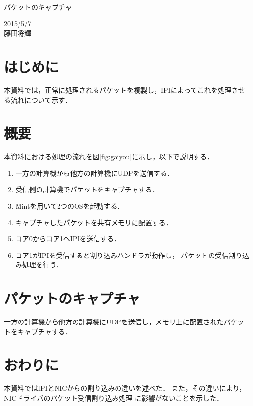 \documentclass[12pt]{jsarticle}
\begin{document}

\begin{center}
{\LARGE パケットのキャプチャ}
\end{center}

\begin{flushright}
  2015/5/7\\
  藤田将輝
\end{flushright}
\section{はじめに}
本資料では，正常に処理されるパケットを複製し，IPIによってこれを処理させる流れについて示す．
\section{概要}
本資料における処理の流れを図\ref{fig:gaiyou}に示し，以下で説明する．
\begin{enumerate}
    \item 一方の計算機から他方の計算機にUDPを送信する．
    \item 受信側の計算機でパケットをキャプチャする．
    \item Mintを用いて2つのOSを起動する．
    \item キャプチャしたパケットを共有メモリに配置する．
    \item コア0からコア1へIPIを送信する．
    \item コア1がIPIを受信すると割り込みハンドラが動作し，
        パケットの受信割り込み処理を行う．
\end{enumerate}
\section{パケットのキャプチャ}
一方の計算機から他方の計算機にUDPを送信し，メモリ上に配置されたパケットをキャプチャする．

\section{おわりに}
本資料ではIPIとNICからの割り込みの違いを述べた．
また，その違いにより，NICドライバのパケット受信割り込み処理
に影響がないことを示した．
\end{document}
